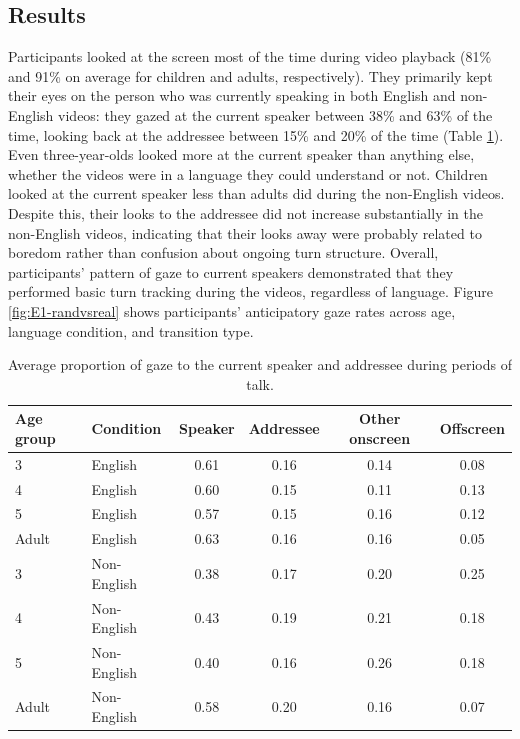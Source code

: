 \documentclass[authoryear, 12pt]{elsarticle}
\begin{document}
\subsection{Results}
\label{sec:results1}

Participants looked at the screen most of the time during video playback (81\% and 91\% on average for children and adults, respectively). They primarily kept their eyes on the person who was currently speaking in both English and non-English videos: they gazed at the current speaker between 38\% and 63\% of the time, looking back at the addressee between 15\% and 20\% of the time (Table \ref{tab:e1_look}). Even three-year-olds looked more at the current speaker than anything else, whether the videos were in a language they could understand or not. Children looked at the current speaker less than adults did during the non-English videos. Despite this, their looks to the addressee did not increase substantially in the non-English videos, indicating that their looks away were probably related to boredom rather than confusion about ongoing turn structure. Overall, participants' pattern of gaze to current speakers demonstrated that they performed basic turn tracking during the videos, regardless of language. Figure \ref{fig:E1-randvsreal} shows participants' anticipatory gaze rates across age, language condition, and transition type.

\linespread{1}
\begin{table}[t]
\begin{center}
  \begin{tabular}{llcccc}
    \hline
    Age group & Condition & Speaker & Addressee & Other onscreen & Offscreen\\ 
    \hline
    3 & English & 0.61 & 0.16 & 0.14 & 0.08 \\ 
    4 & English & 0.60 & 0.15 & 0.11 & 0.13 \\ 
    5 & English & 0.57 & 0.15 & 0.16 & 0.12 \\ 
    Adult & English & 0.63 & 0.16 & 0.16 & 0.05 \\ 
    3 & Non-English & 0.38 & 0.17 & 0.20 & 0.25 \\ 
    4 & Non-English & 0.43 & 0.19 & 0.21 & 0.18 \\ 
    5 & Non-English & 0.40 & 0.16 & 0.26 & 0.18 \\ 
    Adult & Non-English & 0.58 & 0.20 & 0.16 & 0.07 \\ 
    \hline
  \end{tabular}
\end{center}
  \caption{Average proportion of gaze to the current speaker and addressee during periods of talk.}
\label{tab:e1_look}
\end{table}
\linespread{2}
\end{document}
